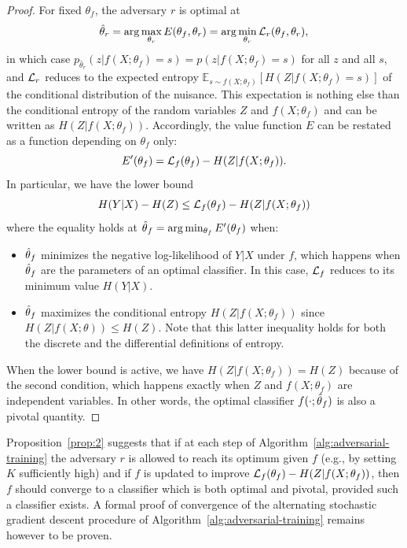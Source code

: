 \documentclass[twocolumn,superscriptaddress,aps]{revtex4-1}
\theoremstyle{plain}
\begin{document}
\begin{proof}

For fixed $\theta_f$, the adversary $r$ is optimal at $$\hat\theta_r = \arg
\max_{\theta_r} E(\theta_f, \theta_r)  = \arg \min_{\theta_r} {\cal
L}_r(\theta_f, \theta_r),$$ in which case $p_{\hat\theta_r}(z|f(X;\theta_f)=s) =
p(z|f(X;\theta_f)=s)$ for all $z$ and all $s$, and ${\cal L}_r$ reduces to the expected entropy
$\mathbb{E}_{s \sim f(X;\theta_f)} [ H({Z|f(X;\theta_f)=s}) ]$ of the conditional distribution of the nuisance.
This expectation is nothing else than the conditional entropy of the random variables
$Z$ and $f(X;\theta_f)$ and can be written as $H(Z|f(X;\theta_f))$.
Accordingly, the
value function $E$ can be restated as a function depending on $\theta_f$ only: $$E'(\theta_f) = {\cal
L}_f(\theta_f) -  H({Z|f(X;\theta_f)}).$$  In particular, we have the lower
bound $$H({Y|X}) - H(Z) \leq {\cal L}_f(\theta_f) - H({Z|f(X;\theta_f)})$$
where the equality holds at $\smash{\hat\theta}_f = \arg \min_{\theta_f}
E'(\theta_f)$  when:
\begin{itemize}
    \item $\smash{\hat\theta}_f$ minimizes the negative log-likelihood of $Y|X$ under $f$,
    which happens when $\smash{\hat\theta}_f$ are the parameters
    of an optimal classifier. In this case, ${\cal L}_f$ reduces to its
    minimum value $H({Y|X})$.

    \item $\smash{\hat\theta}_f$ maximizes the conditional entropy
    $H({Z|f(X;\theta_f)})$ since $H(Z|f(X;\theta)) \leq H(Z)$. Note that this
    latter inequality holds for both the discrete and the differential definitions of entropy.
\end{itemize}
When the lower bound is active, we have $H(Z|f(X;\theta_f)) = H(Z)$
because of the second condition, which happens exactly when $Z$ and $f(X;\theta_f)$
are independent variables. In other words,  the
optimal classifier $f(\cdot;\smash{\hat\theta}_f)$ is also a pivotal
quantity.

\end{proof}

Proposition~\ref{prop:2} suggests that if at each step of
Algorithm~\ref{alg:adversarial-training} the adversary $r$ is allowed to reach
its optimum given $f$ (e.g., by setting $K$ sufficiently high) and if $f$ is
updated to improve ${\cal L}_f(\theta_f) -  H({Z|f(X;\theta_f)})$, then $f$
should converge to a classifier which is both optimal and pivotal, provided such
a classifier exists. A formal proof of convergence of the alternating
stochastic gradient descent procedure of
Algorithm~\ref{alg:adversarial-training} remains however to be proven.
\end{document}
